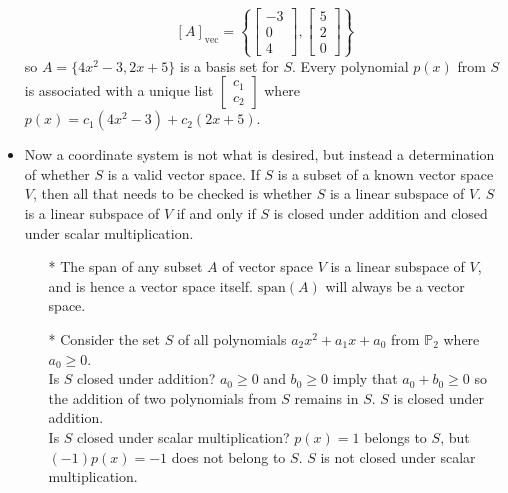 \documentclass{article}
\begin{document}
\begin{itemize}
\[[A]_{\text{vec}} = \left\{\begin{bmatrix} -3 \\ 0 \\ 4 \end{bmatrix}, \begin{bmatrix} 5 \\ 2 \\ 0 \end{bmatrix}\right\}\] 
so \(A = \{4x^2 - 3, 2x + 5\}\) is a basis set for \(S\). Every polynomial \(p(x)\) from \(S\) is associated with a unique list \(\begin{bmatrix} c_1 \\ c_2 \end{bmatrix}\) where \(p(x) = c_1(4x^2 - 3) + c_2(2x + 5)\). 
\item Now a coordinate system is not what is desired, but instead a determination of whether \(S\) is a valid vector space. If \(S\) is a subset of a known vector space \(V\), then all that needs to be checked is whether \(S\) is a linear subspace of \(V\). \(S\) is a linear subspace of \(V\) if and only if \(S\) is closed under addition and closed under scalar multiplication. 
\begin{itemize}
\item[*] The span of any subset \(A\) of vector space \(V\) is a linear subspace of \(V\), and is hence a vector space itself. \(\text{span}(A)\) will always be a vector space. 
\item[*] Consider the set \(S\) of all polynomials \(a_2 x^2 + a_1 x + a_0\) from \(\mathbb{P}_2\) where \(a_0 \geq 0\). \\
Is \(S\) closed under addition? \(a_0 \geq 0\) and \(b_0 \geq 0\) imply that \(a_0 + b_0 \geq 0\) so the addition of two polynomials from \(S\) remains in \(S\). \(S\) is closed under addition. \\
Is \(S\) closed under scalar multiplication? \(p(x) = 1\) belongs to \(S\), but \((-1)p(x) = -1\) does not belong to \(S\). \(S\) is not closed under scalar multiplication. \\

\end{itemize}
\end{itemize}
\end{document}
